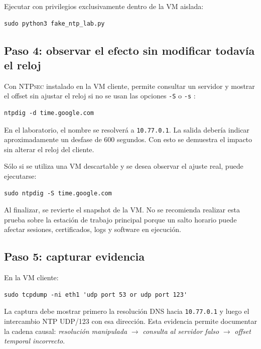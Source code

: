 \documentclass[11pt,a4paper]{article}
\newcommand{\cmd}[1]{\texttt{\detokenize{#1}}}
\newcommand{\ntpsec}{\textsc{NTPsec}}
\begin{document}
Ejecutar con privilegios exclusivamente dentro de la VM aislada:

\begin{lstlisting}[style=terminal]
sudo python3 fake_ntp_lab.py
\end{lstlisting}

\subsection{Paso 4: observar el efecto sin modificar todavía el reloj}

Con \ntpsec{} instalado en la VM cliente, \cmd{ntpdig} permite consultar un servidor y mostrar el offset sin ajustar el reloj si no se usan las opciones \texttt{-S} o \texttt{-s} \cite{ntpdig}:

\begin{lstlisting}[style=terminal]
ntpdig -d time.google.com
\end{lstlisting}

En el laboratorio, el nombre se resolverá a \texttt{10.77.0.1}. La salida debería indicar aproximadamente un desfase de 600 segundos. Con esto se demuestra el impacto sin alterar el reloj del cliente.

Sólo si se utiliza una VM descartable y se desea observar el ajuste real, puede ejecutarse:

\begin{lstlisting}[style=terminal]
sudo ntpdig -S time.google.com
\end{lstlisting}

Al finalizar, se revierte el snapshot de la VM. No se recomienda realizar esta prueba sobre la estación de trabajo principal porque un salto horario puede afectar sesiones, certificados, logs y software en ejecución.

\subsection{Paso 5: capturar evidencia}

En la VM cliente:

\begin{lstlisting}[style=terminal]
sudo tcpdump -ni eth1 'udp port 53 or udp port 123'
\end{lstlisting}

La captura debe mostrar primero la resolución DNS hacia \texttt{10.77.0.1} y luego el intercambio NTP UDP/123 con esa dirección. Esta evidencia permite documentar la cadena causal: \emph{resolución manipulada} $\rightarrow$ \emph{consulta al servidor falso} $\rightarrow$ \emph{offset temporal incorrecto}.
\end{document}
